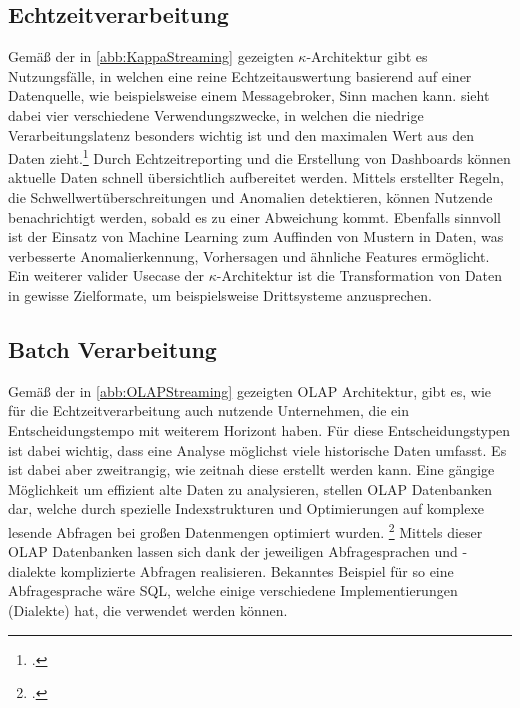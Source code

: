 \subsection{Echtzeitverarbeitung}
Gemäß der in \autoref{abb:KappaStreaming} gezeigten $\kappa$-Architektur gibt es Nutzungsfälle, in welchen eine reine Echtzeitauswertung basierend auf einer Datenquelle, wie beispielsweise einem Messagebroker, Sinn machen kann. \citeauthor{Belur.2020} sieht dabei vier verschiedene Verwendungszwecke, in welchen die niedrige Verarbeitungslatenz besonders wichtig ist und den maximalen Wert aus den Daten zieht.\footcite[Vgl. auch im Folgenden][]{Belur.2020} Durch Echtzeitreporting und die Erstellung von Dashboards können aktuelle Daten schnell übersichtlich aufbereitet werden. Mittels erstellter Regeln, die Schwellwertüberschreitungen und Anomalien detektieren, können Nutzende benachrichtigt werden, sobald es zu einer Abweichung kommt. Ebenfalls sinnvoll ist der Einsatz von Machine Learning zum Auffinden von Mustern in Daten, was verbesserte Anomalierkennung, Vorhersagen und ähnliche Features ermöglicht. Ein weiterer valider Usecase der $\kappa$-Architektur ist die Transformation von Daten in gewisse Zielformate, um beispielsweise Drittsysteme anzusprechen.


\subsection{Batch Verarbeitung}

Gemäß der in \autoref{abb:OLAPStreaming} gezeigten \ac{OLAP} Architektur, gibt es, wie für die Echtzeitverarbeitung auch nutzende Unternehmen, die ein Entscheidungstempo mit weiterem Horizont haben. Für diese Entscheidungstypen ist dabei wichtig, dass eine Analyse möglichst viele historische Daten umfasst. Es ist dabei aber zweitrangig, wie zeitnah diese erstellt werden kann. 
Eine gängige Möglichkeit um effizient alte Daten zu analysieren, stellen \ac{OLAP} Datenbanken dar, welche durch spezielle Indexstrukturen und Optimierungen auf komplexe lesende Abfragen bei großen Datenmengen optimiert wurden. \footcite[Vgl.][5\psq]{Codd.1993} Mittels dieser \ac{OLAP} Datenbanken lassen sich dank der jeweiligen Abfragesprachen und -dialekte komplizierte Abfragen realisieren. Bekanntes Beispiel für so eine Abfragesprache wäre \ac{SQL}, welche einige verschiedene Implementierungen (Dialekte) hat, die verwendet werden können. 